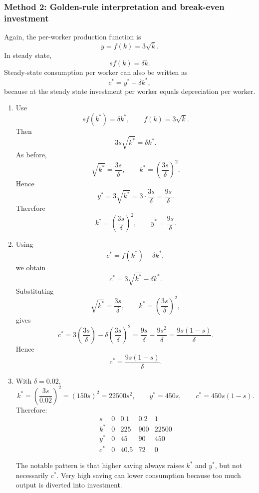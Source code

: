 \documentclass[12pt]{article}
\begin{document}
\subsubsection{Method 2: Golden-rule interpretation and break-even investment}
Again, the per-worker production function is
\[
y=f(k)=3\sqrt{k}.
\]
In steady state,
\[
sf(k)=\delta k.
\]
Steady-state consumption per worker can also be written as
\[
c^*=y^*-\delta k^*,
\]
because at the steady state investment per worker equals depreciation per worker.

\begin{enumerate}[label=(\alph*)]
    \item
    Use
    \[
    s f(k^*)=\delta k^*,
    \qquad
    f(k)=3\sqrt{k}.
    \]
    Then
    \[
    3s\sqrt{k^*}=\delta k^*.
    \]
    As before,
    \[
    \sqrt{k^*}=\frac{3s}{\delta},
    \qquad
    k^*=\left(\frac{3s}{\delta}\right)^2.
    \]
    Hence
    \[
    y^*=3\sqrt{k^*}=3\cdot \frac{3s}{\delta}=\frac{9s}{\delta}.
    \]
    Therefore
    \[
    \boxed{k^*=\left(\frac{3s}{\delta}\right)^2,\qquad y^*=\frac{9s}{\delta}.}
    \]

    \item
    Using
    \[
    c^*=f(k^*)-\delta k^*,
    \]
    we obtain
    \[
    c^*=3\sqrt{k^*}-\delta k^*.
    \]
    Substituting
    \[
    \sqrt{k^*}=\frac{3s}{\delta},
    \qquad
    k^*=\left(\frac{3s}{\delta}\right)^2,
    \]
    gives
    \[
    c^*=3\left(\frac{3s}{\delta}\right)-\delta \left(\frac{3s}{\delta}\right)^2
    =\frac{9s}{\delta}-\frac{9s^2}{\delta}
    =\frac{9s(1-s)}{\delta}.
    \]
    Hence
    \[
    \boxed{c^*=\frac{9s(1-s)}{\delta}.}
    \]

    \item
    With \(\delta=0.02\),
    \[
    k^*=\left(\frac{3s}{0.02}\right)^2=(150s)^2=22500s^2,
    \qquad
    y^*=450s,
    \qquad
    c^*=450s(1-s).
    \]
    Therefore:
    \[
    \boxed{
    \begin{array}{c|cccc}
    s & 0 & 0.1 & 0.2 & 1 \\ \hline
    k^* & 0 & 225 & 900 & 22500 \\
    y^* & 0 & 45 & 90 & 450 \\
    c^* & 0 & 40.5 & 72 & 0
    \end{array}}
    \]

    The notable pattern is that higher saving always raises \(k^*\) and \(y^*\), but not necessarily \(c^*\). Very high saving can lower consumption because too much output is diverted into investment.


\end{enumerate}
\end{document}
